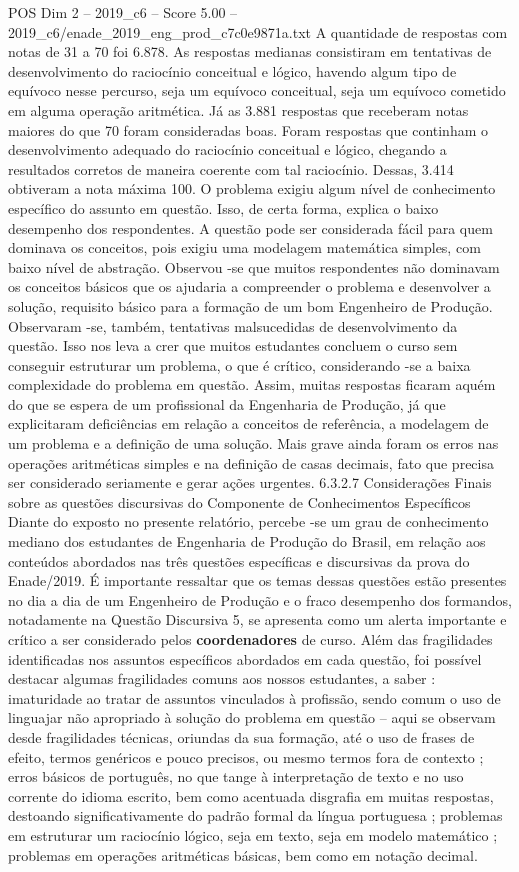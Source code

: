 \begin{textsample}{POS Dim 2 – 2019\_c6 – Score 5.00 – 2019\_c6/enade\_2019\_eng\_prod\_c7c0e9871a.txt}
A quantidade de respostas com notas de 31 a 70 foi 6.878.
As respostas medianas consistiram em tentativas de desenvolvimento do raciocínio conceitual e lógico, havendo algum tipo de equívoco nesse percurso, seja um equívoco conceitual, seja um equívoco cometido em alguma operação aritmética.
Já as 3.881 respostas que receberam notas maiores do que 70 foram consideradas boas.
Foram respostas que continham o desenvolvimento adequado do raciocínio conceitual e lógico, chegando a resultados corretos de maneira coerente com tal raciocínio.
Dessas, 3.414 obtiveram a nota máxima 100.
O problema exigiu algum nível de conhecimento específico do assunto em questão.
Isso, de certa forma, explica o baixo desempenho dos respondentes.
A questão pode ser considerada fácil para quem dominava os conceitos, pois exigiu uma modelagem matemática simples, com baixo nível de abstração.
Observou -se que muitos respondentes não dominavam os conceitos básicos que os ajudaria a compreender o problema e desenvolver a solução, requisito básico para a formação de um bom Engenheiro de Produção.
Observaram -se, também, tentativas malsucedidas de desenvolvimento da questão.
Isso nos leva a crer que muitos estudantes concluem o curso sem conseguir estruturar um problema, o que é crítico, considerando -se a baixa complexidade do problema em questão.
Assim, muitas respostas ficaram aquém do que se espera de um profissional da Engenharia de Produção, já que explicitaram deficiências em relação a conceitos de referência, a modelagem de um problema e a definição de uma solução.
Mais grave ainda foram os erros nas operações aritméticas simples e na definição de casas decimais, fato que precisa ser considerado seriamente e gerar ações urgentes. 6.3.2.7 Considerações Finais sobre as questões discursivas do Componente de Conhecimentos Específicos Diante do exposto no presente relatório, percebe -se um grau de conhecimento mediano dos estudantes de Engenharia de Produção do Brasil, em relação aos conteúdos abordados nas três questões específicas e discursivas da prova do Enade/2019.
É importante ressaltar que os temas dessas questões estão presentes no dia a dia de um Engenheiro de Produção e o fraco desempenho dos formandos, notadamente na Questão Discursiva 5, se apresenta como um alerta importante e crítico a ser considerado pelos \textbf{coordenadores} de curso.
Além das fragilidades identificadas nos assuntos específicos abordados em cada questão, foi possível destacar algumas fragilidades comuns aos nossos estudantes, a saber : imaturidade ao tratar de assuntos vinculados à profissão, sendo comum o uso de linguajar não apropriado à solução do problema em questão – aqui se observam desde fragilidades técnicas, oriundas da sua formação, até o uso de frases de efeito, termos genéricos e pouco precisos, ou mesmo termos fora de contexto ; erros básicos de português, no que tange à interpretação de texto e no uso corrente do idioma escrito, bem como acentuada disgrafia em muitas respostas, destoando significativamente do padrão formal da língua portuguesa ; problemas em estruturar um raciocínio lógico, seja em texto, seja em modelo matemático ; problemas em operações aritméticas básicas, bem como em notação decimal.

\end{textsample}
